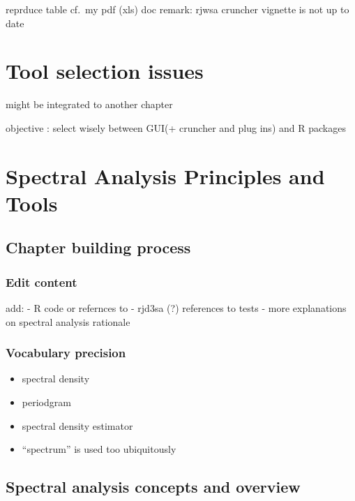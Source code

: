 \documentclass[
  letterpaper,
  DIV=11,
  numbers=noendperiod]{scrreprt}
\providecommand{\tightlist}{%
  \setlength{\itemsep}{0pt}\setlength{\parskip}{0pt}}\usepackage{longtable,booktabs,array}
\begin{document}
reprduce table cf.~my pdf (xls) doc remark: rjwsa cruncher vignette is
not up to date

\hypertarget{tool-selection-issues}{%
\chapter{Tool selection issues}\label{tool-selection-issues}}

might be integrated to another chapter

objective : select wisely between GUI(+ cruncher and plug ins) and R
packages

\hypertarget{spectral-analysis-principles-and-tools}{%
\chapter{Spectral Analysis Principles and
Tools}\label{spectral-analysis-principles-and-tools}}

\hypertarget{chapter-building-process-2}{%
\section{Chapter building process}\label{chapter-building-process-2}}

\hypertarget{edit-content-2}{%
\subsection{Edit content}\label{edit-content-2}}

add: - R code or refernces to - rjd3sa (?) references to tests - more
explanations on spectral analysis rationale

\hypertarget{vocabulary-precision}{%
\subsection{Vocabulary precision}\label{vocabulary-precision}}

\begin{itemize}
\tightlist
\item
  spectral density
\item
  periodgram
\item
  spectral density estimator
\item
  ``spectrum'' is used too ubiquitously
\end{itemize}

\hypertarget{spectral-analysis-concepts-and-overview}{%
\section{Spectral analysis concepts and
overview}\label{spectral-analysis-concepts-and-overview}}
\end{document}
